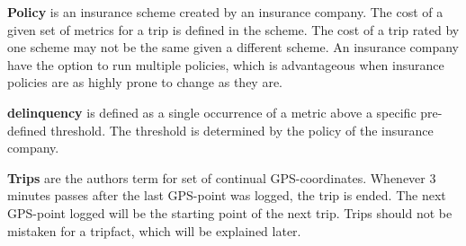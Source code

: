 \textbf{Policy} is an insurance scheme created by an insurance company. The cost of a given set of metrics for a trip is defined in the scheme. The cost of a trip rated by one scheme may not be the same given a different scheme. An insurance company have the option to run multiple policies, which is advantageous when insurance policies are as highly prone to change as they are. 

\textbf{delinquency} is defined as a single occurrence of a metric above a specific pre-defined threshold. The threshold is determined by the policy of the insurance company.

\textbf{Trips} are the authors term for set of continual GPS-coordinates. Whenever 3 minutes passes after the last GPS-point was logged, the trip is ended. The next GPS-point logged will be the starting point of the next trip. Trips should not be mistaken for a tripfact, which will be explained later.